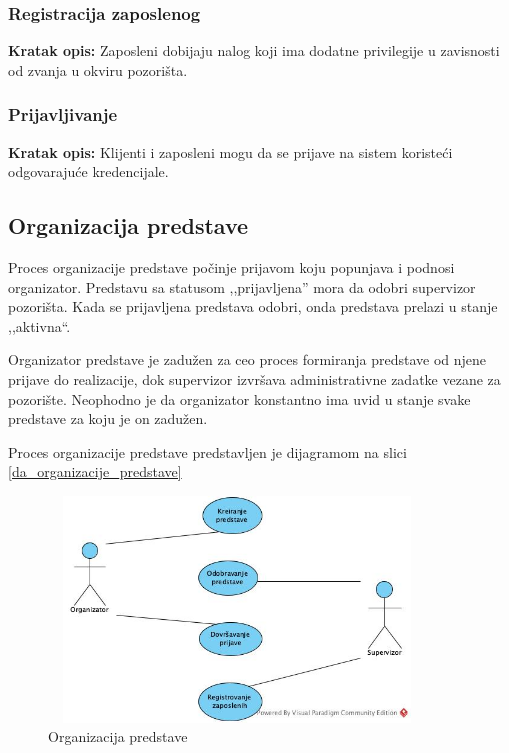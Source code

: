 \documentclass[a4paper]{article}
\begin{document}
\subsubsection{Registracija zaposlenog} 
\noindent\textbf{Kratak opis:} Zaposleni dobijaju nalog koji ima dodatne privilegije u zavisnosti 
  od zvanja u okviru pozorišta.

\subsubsection{Prijavljivanje}
\noindent\textbf{Kratak opis:} Klijenti i zaposleni mogu da se prijave na sistem koristeći odgovarajuće kredencijale.

\subsection{Organizacija predstave}
Proces organizacije predstave počinje prijavom koju popunjava i podnosi organizator. Predstavu sa statusom ,,prijavljena'' mora da odobri supervizor pozorišta. Kada se prijavljena predstava odobri, onda predstava prelazi u stanje ,,aktivna``. 

Organizator predstave je zadužen za ceo proces formiranja predstave od njene prijave do realizacije, dok supervizor izvršava administrativne zadatke vezane za pozorište. Neophodno je da organizator konstantno ima uvid u stanje svake predstave za koju je on zadužen. 

Proces organizacije predstave predstavljen je dijagramom na slici \ref{da_organizacije_predstave}

\begin{figure}[H]
  \begin{center}
      \includegraphics[width=100mm,height=60mm]{../images/usecase_organizacija_predstave.jpg}
  \end{center}
  \caption{Organizacija predstave}
  \label{usecase_prodaja_karata}
\end{figure}
\end{document}

